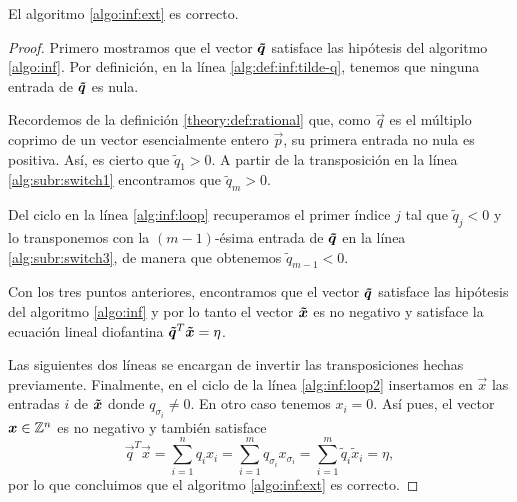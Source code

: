 \begin{theorem}
	\label{th:alg:inf}
	El algoritmo \ref{algo:inf:ext} es correcto.
\end{theorem}
\begin{proof}
	Primero mostramos que el vector $\boldsymbol{\tilde{q}}$ satisface las hipótesis del algoritmo
	\ref{algo:inf}. Por definición, en la línea \ref{alg:def:inf:tilde-q}, tenemos que ninguna
	entrada de $\boldsymbol{\tilde{q}}$ es nula.

	Recordemos de la definición \ref{theory:def:rational} que, como $\vec{q}$ es el múltiplo coprimo
	de un vector esencialmente entero $\vec{p}$, su primera entrada no nula es positiva. Así, es
	cierto que $\tilde{q}_1 > 0$. A partir de la transposición en la línea \ref{alg:subr:switch1}
	encontramos que $\tilde{q}_m > 0$.

	Del ciclo en la línea \ref{alg:inf:loop} recuperamos el primer índice $j$ tal que $\tilde{q}_j < 0$ y
	lo transponemos con la $(m - 1)$-ésima entrada de $\boldsymbol{\tilde{q}}$ en la línea
	\ref{alg:subr:switch3}, de manera que obtenemos $\tilde{q}_{m-1} < 0$.

	Con los tres puntos anteriores, encontramos que el vector $\boldsymbol{\tilde{q}}$ satisface las
	hipótesis del algoritmo \ref{algo:inf} y por lo tanto el vector $\boldsymbol{\tilde{x}}$ es no negativo
	y satisface la ecuación lineal diofantina $\boldsymbol{\tilde{q}}^T\boldsymbol{\tilde{x}} = \eta$.

	Las siguientes dos líneas se encargan de invertir las transposiciones hechas previamente.
	Finalmente, en el ciclo de la línea \ref{alg:inf:loop2} insertamos en $\vec{x}$ las entradas $i$
	de $\boldsymbol{\tilde{x}}$ donde $q_{\sigma_i} \neq 0$. En otro caso tenemos $x_i = 0$. Así pues, el vector
	$\boldsymbol{x} \in \mathbb{Z}^n$ es no negativo y también satisface
	\begin{equation*}
		\vec{q}^T\vec{x} = \sum_{i = 1}^{n}q_ix_i
		= \sum_{i = 1}^{m}q_{\sigma_i}x_{\sigma_i}
		= \sum_{i = 1}^{m}\tilde{q}_i\tilde{x}_i
		= \eta,
	\end{equation*}
	por lo que concluimos que el algoritmo \ref{algo:inf:ext} es correcto.
\end{proof}

